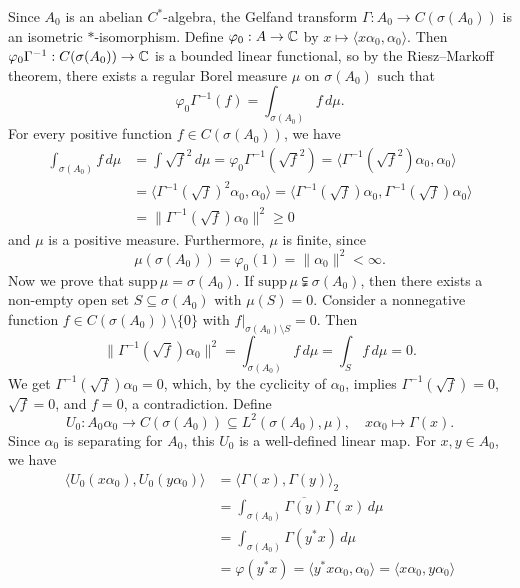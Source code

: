 \begin{myproof}
  Since $A_0$ is an abelian $C^*$-algebra, the Gelfand transform $\Gamma: A_0 \to C(\sigma(A_0))$ is an isometric $*$-isomorphism. Define $\varphi_0: A \to \mathbb {C}$ by $x \mapsto \langle x \alpha_0, \alpha_0\rangle$. Then $\varphi_0 \Gamma^{-1} : C(\sigma(A_0)) \to \mathbb {C}$ is a bounded linear functional, so by the Riesz--Markoff theorem, there exists a regular Borel measure $\mu$ on $\sigma(A_0)$ such that
  $$ \varphi_0 \Gamma^{-1} (f) = \int_{\sigma(A_0)} f\, d\mu. $$
  For every positive function $f \in C(\sigma(A_0))$, we have 
  \begin{align*}
    \int_{\sigma(A_0)} f\, d\mu &= \int \sqrt{f}^2\, d\mu = \varphi_0 \Gamma^{-1} (\sqrt{f}^2) = \langle \Gamma^{-1} (\sqrt{f}^2) \alpha_0, \alpha_0 \rangle \\
    &= \langle \Gamma^{-1} (\sqrt{f})^2 \alpha_0, \alpha_0 \rangle = \langle \Gamma^{-1} (\sqrt{f}) \alpha_0, \Gamma^{-1} (\sqrt{f}) \alpha_0 \rangle \\
    &= \| \Gamma^{-1} (\sqrt{f}) \alpha_0 \|^2 \geq 0
  \end{align*}
  and $\mu$ is a positive measure. Furthermore, $\mu$ is finite, since 
  $$ \mu(\sigma(A_0)) = \varphi_0 (1) = \|\alpha_0\|^2 < \infty. $$
  Now we prove that $\mathrm{supp}\, \mu = \sigma(A_0)$. If $\mathrm{supp}\, \mu \subsetneqq \sigma(A_0)$, then there exists a non-empty open set $S \subseteq \sigma(A_0)$ with $\mu(S) = 0$. Consider a nonnegative function $f \in C(\sigma(A_0)) \setminus \{0\}$ with $f\big|_{\sigma(A_0) \setminus S} = 0$. Then 
  $$ \| \Gamma^{-1} (\sqrt{f}) \alpha_0 \|^2 = \int_{\sigma(A_0)} f\, d\mu = \int_S f\, d\mu = 0. $$
  We get $\Gamma^{-1} (\sqrt{f}) \alpha_0 = 0$, which, by the cyclicity of $\alpha_0$, implies $\Gamma^{-1} (\sqrt{f}) = 0$, $\sqrt{f} = 0$, and $f = 0$, a contradiction. 
  Define 
  $$ U_0 : A_0 \alpha_0 \to C(\sigma(A_0)) \subseteq L^2 (\sigma(A_0), \mu), \quad x \alpha_0 \mapsto \Gamma(x). $$
  Since $\alpha_0$ is separating for $A_0$, this $U_0$ is a well-defined linear map. For $x, y \in A_0$, we have 
  \begin{align*}
    \langle U_0 (x \alpha_0), U_0 (y \alpha_0) \rangle &= \langle \Gamma(x), \Gamma(y)\rangle_2 \\
    &= \int_{\sigma (A_0)}  \overline{\Gamma(y)} \Gamma(x)\, d\mu \\
    &= \int_{\sigma (A_0)} \Gamma(y^* x)\, d\mu \\
    &= \varphi(y^* x) = \langle y^* x \alpha_0, \alpha_0 \rangle = \langle x \alpha_0, y \alpha_0\rangle

\end{align*}
\end{myproof}
